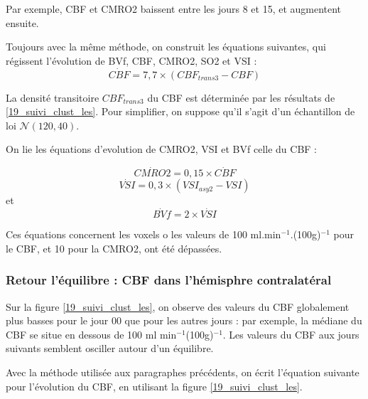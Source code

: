 \begin{enumerate}[label=\textbf{(L\'esion 2 - \arabic*)}]
\par
Par exemple, CBF et CMRO2 baissent entre les jours 8 et 15, et augmentent ensuite.

\par
Toujours avec la m\^eme m\'ethode, on construit les \'equations suivantes, %
qui r\'egissent l'\'evolution de BVf, CBF, CMRO2, SO2 et VSI :
\begin{equation}
\dot{CBF}=7,7\times\left(CBF_{trans3}-CBF\right)
\end{equation}

La densit\'e transitoire $CBF_{trans3}$ du CBF est d\'etermin\'ee par les r\'esultats de \ref{19_suivi_clust_les}. %
Pour simplifier, on suppose qu'il s'agit d'un \'echantillon de loi $\mathcal{N}(120,40)$.

\par
On lie les \'equations d'evolution de CMRO2, VSI et BVf  celle du CBF :

\begin{equation}
\dot{CMRO2}=0,15\times\dot{CBF}
\end{equation}
\begin{equation}
\dot{VSI}=0,3\times (VSI_{asy2}-VSI)
\end{equation}
et%
\begin{equation}
\dot{BVf}=2\times\dot{VSI}
\end{equation}

Ces \'equations concernent les voxels o les valeurs de 100 ml.min${}^{-1}$.(100g)${}^{-1}$ pour le CBF, %
et 10 pour la CMRO2, ont \'et\'e d\'epass\'ees.
\end{enumerate}



\subsubsection{Retour  l'\'equilibre : CBF dans l'h\'emisphre contralat\'eral}

Sur la figure \ref{19_suivi_clust_les}, on observe des valeurs du CBF globalement plus basses pour le jour 00 que pour les autres jours : %
par exemple, la m\'ediane du CBF se situe en dessous de 100 ml min${}^{-1}$(100g)${}^{-1}$. %
Les valeurs du CBF aux jours suivants semblent osciller autour d'un \'equilibre.

\par
Avec la m\'ethode utilis\'ee aux paragraphes pr\'ec\'edents, on \'ecrit l'\'equation suivante pour l'\'evolution du CBF, %
en utilisant la figure \ref{19_suivi_clust_les}.

